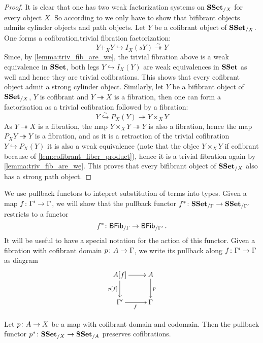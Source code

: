 \documentclass[reqno,10pt,a4paper,oneside,draft]{amsart}
\begin{document}
\begin{proof}

It is clear that one has two weak factorization systems on $\mathbf{SSet}_{/X}$ for every object $X$. So according to \cite[Definition~2.1.11]{henry2018wms} we only have to show that bifibrant objects admits cylinder objects and path objects. Let $Y$ be a cofibrant object of $\mathbf{SSet}_{/X}$. One forms a cofibration,trivial fibration factorization:
\[ 
Y +_X Y \hookrightarrow I_X(sY) \overset{\sim}{\twoheadrightarrow} Y 
\]
Since, by  \cref{lemma:triv_fib_are_we}, the trivial fibration above is a weak equivalence in $\mathbf{SSet}$, both legs $Y \hookrightarrow I_X(Y)$ are weak equivalences in $\mathbf{SSet}$ as well and hence they are trivial cofibrations. This shows that every cofibrant object admit a strong cylinder object. Similarly, let $Y$ be a bifibrant object of $\mathbf{SSet}_{/X}$, \ie $Y$ is cofibrant and $Y \twoheadrightarrow X$ is a fibration, then one can form a factorisation as a trivial cofibration followed by a fibration:
\[ 
Y \overset{\sim}{\hookrightarrow} P_X(Y) {\twoheadrightarrow} Y \times_{X} Y 
\]
As $Y \twoheadrightarrow X$ is a fibration, the map $Y \times_X Y \twoheadrightarrow Y$ is also a fibration, hence the map $P_X Y \twoheadrightarrow Y$ is a fibration, and as it is a retraction of the trivial cofibration $Y \hookrightarrow P_X(Y)$ it is also a weak equivalence (note that the objec $Y \times_X Y$ if cofibrant because of \cref{lem:cofibrant_fiber_product}), hence it is a trivial fibration again by \cref{lemma:triv_fib_are_we}. This proves that every bifibrant object of $\mathbf{SSet}_{/X}$ also has a strong path object.
\end{proof}




We use pullback functors to intepret substitution of terms into types. Given a map $f \colon \Gamma' \to \Gamma$, we will show that the pullback functor $f^* \colon \mathbf{SSet}_{/\Gamma} \to \mathbf{SSet}_{/\Gamma'}$ restricts to a functor
\[
f^* \colon \mathsf{BFib}_{/\Gamma}  \to \mathsf{BFib}_{/\Gamma'} \, .
\]
It will be useful to have a special notation for the action of this functor. Given a fibration with cofibrant
domain $p \colon A \to \Gamma$, we write its pullback along $f \colon \Gamma' \to \Gamma$ as diagram
\[
\xymatrix{
A[f] \ar[r] \ar[d]_{p[f]} & A \ar[d]^p \\
\Gamma' \ar[r]_f & \Gamma }
\]





\begin{proposition} \label{thm:cof-pbk} Let $p \colon A \to X$  be a map with cofibrant domain and codomain.
Then the pullback functor $p^* \colon \mathbf{SSet}_{/X} \to \mathbf{SSet}_{/A}$ preserves cofibrations. 
\end{proposition}
\end{document}
